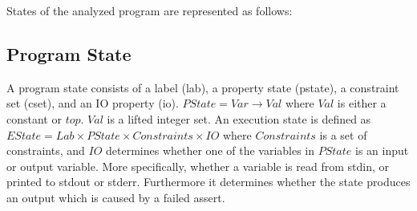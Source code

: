 \documentclass[natbib]{article}
\begin{document}
\noindent States of the analyzed program are represented as follows:

\subsection{Program State}

A program state consists of a label (lab), a property state (pstate),
a constraint set (cset), and an IO property (io). $PState = Var
\rightarrow Val$ where $Val$ is either a constant or $top$. $Val$ is a
lifted integer set. An execution state is defined as $EState = Lab \times
PState \times Constraints \times IO$ where $Constraints$ is a set of
constraints, and $IO$ determines whether one of the variables in $PState$ is
an input or output variable. More specifically, whether a variable is
read from stdin, or printed to stdout or stderr. Furthermore it
determines whether the state produces an output which is caused by a
failed assert.



\end{document}
